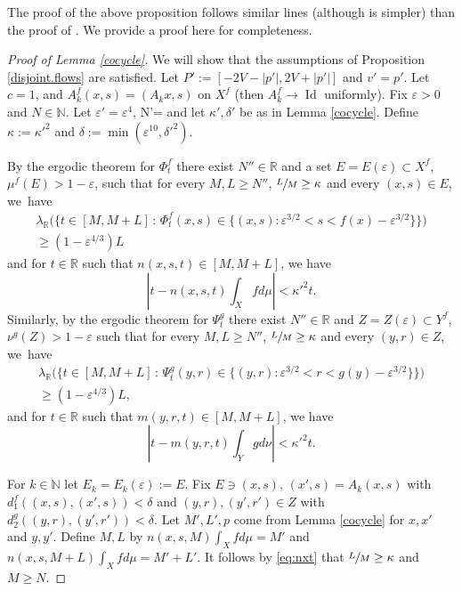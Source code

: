 \documentclass[10pt]{amsart}
\let\epsilon\varepsilon
\newcommand{\sep}{\,:\,}
\DeclareMathOperator{\Id}{Id}
\theoremstyle{definition}
\theoremstyle{plain}
\newcommand\NN{\mathbb{N}}
\newcommand\RR{\mathbb{R}}
\begin{document}
The proof of the above proposition follows similar lines (although is simpler) than the proof of \cite[Prop.\,4.1]{KLU}. We provide a proof here for completeness.

\begin{proof}[Proof of Lemma \ref{cocycle}]
We will show that the assumptions of Proposition \ref{disjoint.flows} are satisfied. Let $P':=[-2V-|p'|,2V+|p'|]$ and $v'=p'$. Let $c=1$, and $A_k^f(x,s)=(A_kx,s)$ on $X^f$ (then $A_k^f\to \Id$ uniformly).
Fix $\epsilon>0$ and $N\in \NN$. Let $\epsilon'=\epsilon^4$, N'= and let $\kappa', \delta'$ be as in Lemma \ref{cocycle}. Define $\kappa:=\kappa'^2$ and $\delta:= \min(\epsilon^{10},\delta'^2)$.

By the ergodic theorem for $\Phi_t^f$ there exist $N''\in \RR$ and a set $E=E(\epsilon)\subset X^f$,
$\mu^f(E)>1-\epsilon$, such that for every $M,L\geq N''$, $\sfrac{L}{M}\geq \kappa$ and every $(x,s)\in E$, we~have
\begin{multline}\label{eq:bet1}
\lambda_\RR\bigl(\bigl\{t\in [M,M+L]\sep \Phi_t^f(x,s)\in \{(x,s):\epsilon^{3/2}<s<f(x)-\epsilon^{3/2}\}\bigr\}\bigr)\\
\geq (1-\epsilon^{4/3})L
\end{multline}
and for $t\in \RR$ such that $n(x,s,t)\in [M,M+L]$, we have
\begin{equation}\label{eq:nxt}
|t- n(x,s,t)\int_X fd\mu|<\kappa'^2 t.
\end{equation}
Similarly, by the ergodic theorem for $\Psi_t^g$ there exist $N''\in \RR$ and $Z=Z(\epsilon)\subset Y^f$,
$\nu^g(Z)>1-\epsilon$ such that for every $M,L\geq N''$, $\sfrac{L}{M}\geq \kappa$ and every $(y,r)\in Z$, we~have
\begin{multline}\label{eq:bet2}
\lambda_\RR\bigl(\bigl\{t\in [M,M+L]\sep \Psi_t^g(y,r)\in \{(y,r):\epsilon^{3/2}<r<g(y)-\epsilon^{3/2}\}\bigr\}\bigr)\\
\geq (1-\epsilon^{4/3})L,
\end{multline}
and for $t\in \RR$ such that $m(y,r,t)\in [M,M+L]$, we have
\begin{equation}\label{eq:nxt2}
|t- m(y,r,t)\int_Y gd\nu|<\kappa'^2 t.
\end{equation}

For $k\in \NN$ let $E_k=E_k(\epsilon):=E$. Fix $E\ni (x,s)$, $(x',s)=A_k(x,s)$ with $d_1^f((x,s),(x',s))<\delta$ and $(y,r), (y',r')\in Z$ with $d_2^g((y,r),(y',r'))<\delta$. Let $M',L',p$ come from Lemma \ref{cocycle} for $x,x'$ and $y,y'$. Define $M, L$ by $n(x,s,M)\int_X fd\mu =M'$ and $n(x,s,M+L)\int_X fd\mu=M'+L'$. It follows by \eqref{eq:nxt} that $\sfrac{L}{M}\geq \kappa$ and $M\geq N$.


\end{proof}
\end{document}
